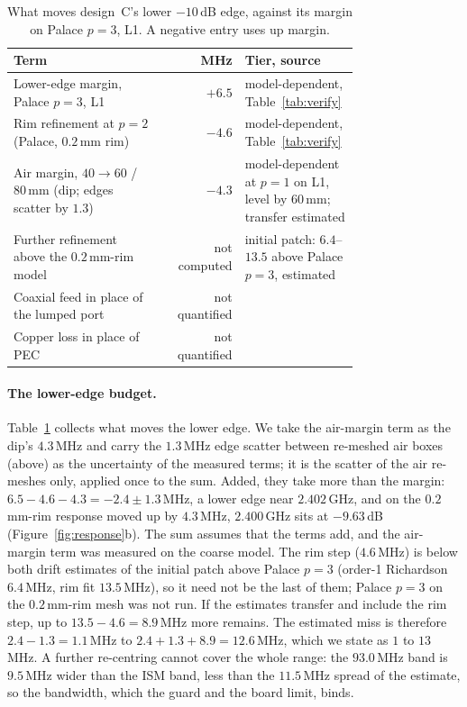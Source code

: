 \documentclass{anvil-paper}
\begin{document}
\begin{table}[t]
  \centering
  \caption{What moves design~C's lower $-10$\,dB edge, against its margin on
  Palace $p = 3$, L1. A negative entry uses up margin.}
  \label{tab:budget}
  \small
  \begin{tabular}{@{}>{\raggedright\arraybackslash}p{0.43\linewidth} r >{\raggedright\arraybackslash}p{0.33\linewidth}@{}}
    \toprule
    Term & MHz & Tier, source \\
    \midrule
    Lower-edge margin, Palace $p = 3$, L1 & $+6.5$ & model-dependent, Table~\ref{tab:verify} \\
    Rim refinement at $p = 2$ (Palace, $0.2$\,mm rim) & $-4.6$ & model-dependent, Table~\ref{tab:verify} \\
    Air margin, $40 \to 60$ / $80$\,mm (dip; edges scatter by $1.3$) & $-4.3$ & model-dependent at $p = 1$ on L1, level by $60$\,mm; transfer estimated \\
    Further refinement above the $0.2$\,mm-rim model & not computed & initial patch: $6.4$--$13.5$ above Palace $p = 3$, estimated \\
    Coaxial feed in place of the lumped port & not quantified & \\
    Copper loss in place of PEC & not quantified & \\
    \bottomrule
  \end{tabular}
\end{table}

\paragraph{The lower-edge budget.}
Table~\ref{tab:budget} collects what moves the lower edge. We take the
air-margin term as the dip's $4.3$\,MHz and carry the $1.3$\,MHz edge scatter
between re-meshed air boxes (above) as the uncertainty
of the measured terms; it is the scatter of the air re-meshes only, applied
once to the sum. Added, they take more than the margin:
$6.5 - 4.6 - 4.3 = -2.4 \pm 1.3$\,MHz, a lower edge near $2.402$\,GHz, and on
the $0.2$\,mm-rim response moved up by $4.3$\,MHz, $2.400$\,GHz sits at
$-9.63$\,dB (Figure~\ref{fig:response}b). The sum assumes that the terms add,
and the air-margin term was measured on the coarse model. The rim step
($4.6$\,MHz) is below both drift estimates of the initial patch above Palace
$p = 3$ (order-1 Richardson $6.4$\,MHz, rim fit $13.5$\,MHz), so it need not be
the last of them; Palace $p = 3$ on the $0.2$\,mm-rim mesh was not run. If the
estimates transfer and include the rim step, up to $13.5 - 4.6 = 8.9$\,MHz
more remains. The estimated miss is therefore $2.4 - 1.3 = 1.1$\,MHz to
$2.4 + 1.3 + 8.9 = 12.6$\,MHz, which we state as $1$ to $13$\,MHz. A further
re-centring cannot cover the whole range: the $93.0$\,MHz band is $9.5$\,MHz
wider than the ISM band, less than the $11.5$\,MHz spread of the estimate, so
the bandwidth, which the guard and the board limit, binds.
\end{document}
